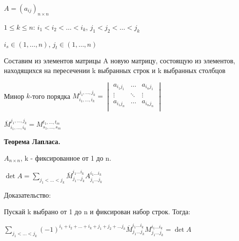 \(A =(a_{ij})_{n \times n}\)

\(1 \leq k \leq n\): \(i_1 < i_2 < \ldots < i_k\), \(j_1 < j_2 < \ldots < j_k\)

\(i_s \in (1, \ldots, n)\), \(j_t \in (1, \ldots, n)\)

Составим из элементов матрицы A новую матрицу, состоящую из элементов, находящихся на пересечении k выбранных строк и k выбранных столбцов

Минор \(k\)-того порядка \(M_{i_1, \ldots, i_k}^{j_1, \ldots, j_k} =
\begin{vmatrix}
    a_{i_1 j_1} & \ldots & a_{i_n j_1} \\
    \vdots & \ddots & \vdots \\
    a_{i_1 j_n} & \ldots & a_{i_n j_n} \\
\end{vmatrix}\)

\(\overline{M}_{i_1, \ldots, i_k}^{j_1, \ldots, j_k} = M_{s_1, \ldots, s_m}^{t_1, \ldots, t_m}\)

\textbf{Теорема Лапласа.}

\(A_{n\times n }\), k - фиксированное от 1 до n. 

\(\det A = \sum\limits_{j_1<\ldots<j_k} \overline{M}_{j_1\ldots j_k}^{i_1\ldots i_k} A_{j_1\ldots j_k}^{i_1\ldots i_k}\)

Доказательство:

Пускай k выбрано от 1 до n и фиксирован набор строк. Тогда:

\(\sum\limits_{j_1<\ldots<j_k}(-1)^{i_1+i_2+\ldots+i_k+ j_1 +j_2 + \ldots j_k} \overline{M}_{j_1\ldots j_k}^{i_1\ldots i_k} M_{j_1\ldots j_k}^{i_1\ldots i_k} = \det A\)

